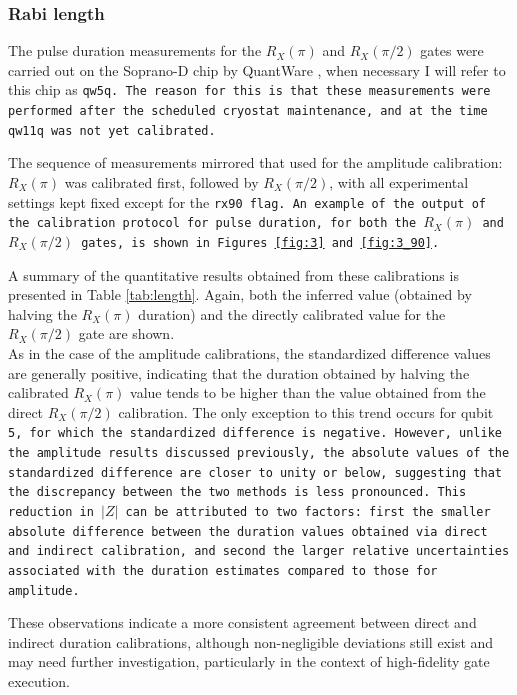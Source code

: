 \subsubsection{Rabi length}
The pulse duration measurements for the $R_X(\pi)$ and $R_X(\pi/2)$ gates were carried out on the Soprano-D chip by QuantWare \cite{qw5q}, when necessary I will refer to this chip as \tt{qw5q}.
The reason for this is that these measurements were performed after the scheduled cryostat maintenance, and at the time \tt{qw11q} was not yet calibrated.

The sequence of measurements mirrored that used for the amplitude calibration: $R_X(\pi)$ was calibrated first, followed by $R_X(\pi/2)$, with all experimental settings kept fixed except for the \tt{rx90} flag.
An example of the output of the calibration protocol for pulse duration, for both the $R_X(\pi)$ and $R_X(\pi/2)$ gates, is shown in Figures \ref{fig:3} and \ref{fig:3_90}. 

A summary of the quantitative results obtained from these calibrations is presented in Table \ref{tab:length}.
Again, both the inferred value (obtained by halving the $R_X(\pi)$ duration) and the directly calibrated value for the $R_X(\pi/2)$ gate are shown.\\
As in the case of the amplitude calibrations, the standardized difference values are generally positive, indicating that the duration obtained by halving the calibrated $R_X(\pi)$ value tends to be higher than the value obtained from the direct $R_X(\pi/2)$ calibration. 
The only exception to this trend occurs for qubit \tt{5}, for which the standardized difference is negative.
However, unlike the amplitude results discussed previously, the absolute values of the standardized difference are closer to unity or below, suggesting that the discrepancy between the two methods is less pronounced.
This reduction in $|Z|$ can be attributed to two factors: first the smaller absolute difference between the duration values obtained via direct and indirect calibration, and second the larger relative uncertainties associated with the duration estimates compared to those for amplitude.

These observations indicate a more consistent agreement between direct and indirect duration calibrations, although non-negligible deviations still exist and may need further investigation, particularly in the context of high-fidelity gate execution.

